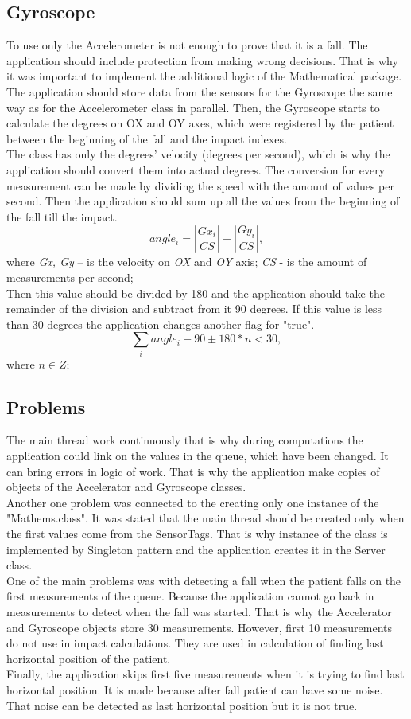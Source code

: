 \documentclass[conference,12pt]{IEEETran}
\begin{document}
\subsection{Gyroscope}
To use only the Accelerometer is not enough to prove that it is a fall. The application should include protection from making wrong decisions. That is why it was important to implement the additional logic of the Mathematical package.\\
The application should store data from the sensors for the Gyroscope the same way as for the Accelerometer class in parallel. Then, the Gyroscope starts to calculate the degrees on OX and OY axes, which were registered by the patient between the beginning of the fall and the impact indexes. \\
The class has only the degrees' velocity (degrees per second), which is why the application should convert them into actual degrees. The conversion for every measurement can be made by dividing the speed with the amount of values per second. Then the application should sum up all the values from the beginning of the fall till the impact.
$$ angle_i = \left| \frac{Gx_i}{CS} \right| + \left| \frac{Gy_i}{CS} \right| ,$$
where \textit{Gx, Gy} – is the velocity on \textit{OX} and \textit{OY} axis; \textit{CS} - is the amount of measurements per second;\\
Then this value should be divided by 180 and the application should take the remainder of the division and subtract from it 90 degrees. If this value is less than 30 degrees the application changes another flag for "true".
$$ {\sum}_i angle_i - 90 \pm 180 * n < 30, $$
where $n \in Z; $

\subsection{Problems}
The main thread work continuously that is why during computations the application could link on the values in the queue, which have been changed. It can bring errors in logic of work. That is why the application make copies of objects of the Accelerator and Gyroscope classes.\\
Another one problem was connected to the creating only one instance of the "Mathems.class". It was stated that the main thread should be created only when the first values come from the SensorTags. That is why instance of the class is implemented by Singleton pattern and the application creates it in the Server class.\\
One of the main problems was with detecting a fall when the patient falls on the first measurements of the queue. Because the application cannot go back in measurements to detect when the fall was started. That is why the Accelerator and Gyroscope objects store 30 measurements. However, first 10 measurements do not use in impact calculations. They are used in calculation of finding last horizontal position of the patient.\\
Finally, the application skips first five measurements when it is trying to find last horizontal position. It is made because after fall patient can have some noise. That noise can be detected as last horizontal position but it is not true.
\end{document}
